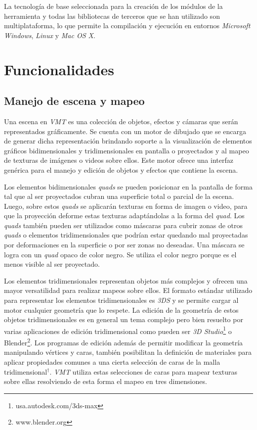 La tecnología de base seleccionada para la creación de los módulos de la herramienta y todas las bibliotecas de terceros que se han utilizado son multiplataforma, lo que permite la compilación y ejecución en entornos \emph{Microsoft Windows}, \emph{Linux} y \emph{Mac OS X}.

\section{Funcionalidades}

\subsection{Manejo de escena y mapeo}

Una escena en \emph{VMT} es una colección de objetos, efectos y cámaras que serán representados gráficamente. Se cuenta con un motor de dibujado que se encarga de generar dicha representación brindando soporte a la visualización de elementos gráficos bidimensionales y tridimensionales en pantalla o proyectados y al mapeo de texturas de imágenes o videos sobre ellos. Este motor ofrece una interfaz genérica para el manejo y edición de objetos y efectos que contiene la escena.

Los elementos bidimensionales \emph{quads} se pueden posicionar en la pantalla de forma tal que al ser proyectados cubran una superficie total o parcial de la escena. Luego, sobre estos \emph{quads} se aplicarán texturas en forma de imagen o video, para que la proyección deforme estas texturas adaptándolas a la forma del \emph{quad}.
Los \emph{quads} también pueden ser utilizados como máscaras para cubrir zonas de otros \emph{quads} o elementos tridimensionales que podrían estar quedando mal proyectadas por deformaciones en la superficie o por ser zonas no deseadas. Una máscara se logra con un \emph{quad} opaco de color negro. Se utiliza el color negro porque es el menos visible al ser proyectado.

Los elementos tridimensionales representan objetos más complejos y ofrecen una mayor versatilidad para realizar mapeos sobre ellos.
El formato estándar utilizado para representar los elementos tridimensionales es \emph{3DS} \cite{3DS} y se permite cargar al motor cualquier geometría que lo respete.
La edición de la geometría de estos objetos tridimensionales es en general un tema complejo pero bien resuelto por varias aplicaciones de edición tridimensional como pueden ser \emph{3D Studio}\footnote{usa.autodesk.com/3ds-max} o Blender\footnote{www.blender.org}. %
Los programas de edición además de permitir modificar la geometría manipulando vértices y caras, también posibilitan la definición de materiales para aplicar propiedades comunes a una cierta selección de caras de la malla tridimensional$^\dagger$. \emph{VMT} utiliza estas selecciones de caras para mapear texturas sobre ellas resolviendo de esta forma el mapeo en tres dimensiones.

